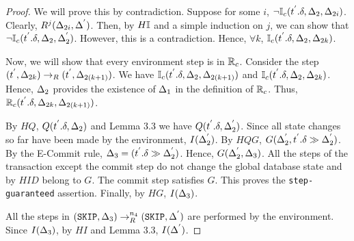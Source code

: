 \documentclass[acmlarge,anonymous]{acmart}\settopmatter{printfolios=true}
\begin{document}
\begin{proof}
We will prove this by contradiction. Suppose for some $i$, $\neg \mathbb{I}_c(t^{'}.\delta, \Delta_2, \Delta_{2i})$. Clearly, $R^{j}(\Delta_{2i}, \Delta^{'})$. Then, by $H\mathbb{I}$ and a simple induction on $j$, we can show that $\neg \mathbb{I}_c(t^{'}.\delta, \Delta_2, \Delta_{2}^{'})$. However, this is a contradiction. Hence, $\forall k$, $\mathbb{I}_c(t^{'}.\delta, \Delta_2, \Delta_{2k})$.

Now, we will show that every environment step is in $\mathbb{R}_c$. Consider the step $(t^{'}, \Delta_{2k}) \rightarrow_R (t^{'}, \Delta_{2(k+1)})$. We have $\mathbb{I}_c(t^{'}.\delta, \Delta_2, \Delta_{2(k+1)})$ and $\mathbb{I}_c(t^{'}.\delta, \Delta_2, \Delta_{2k})$. Hence, $\Delta_2$ provides the existence of $\Delta_1$ in the definition of $\mathbb{R}_c$. Thus, $\mathbb{R}_c(t^{'}.\delta, \Delta_{2k}, \Delta_{2(k+1)})$.

By $HQ$, $Q(t^{'}.\delta, \Delta_2)$ and Lemma 3.3 we have $Q(t^{'}.\delta, \Delta_{2}^{'})$. Since all state changes so far have been made by the environment, $I(\Delta_{2}^{'})$. By $HQG$, $G(\Delta_{2}^{'}, t^{'}.\delta \gg \Delta_{2}^{'})$. By the E-Commit rule, $\Delta_3 = (t^{'}.\delta \gg \Delta_{2}^{'})$. Hence, $G(\Delta_{2}^{'}, \Delta_3)$. All the steps of the transaction except the commit step do not change the global database state and by $HID$ belong to $G$. The commit step satisfies $G$. This proves the \texttt{step-guaranteed} assertion. Finally, by $HG$, $I(\Delta_3)$.


All the steps in $(\texttt{SKIP}, \Delta_3) \rightarrow_{R}^{n_4} (\texttt{SKIP}, \Delta^{'})$ are performed by the environment. Since $I(\Delta_3)$, by $HI$ and Lemma 3.3, $I(\Delta^{'})$.
\end{proof}

\end{document}
